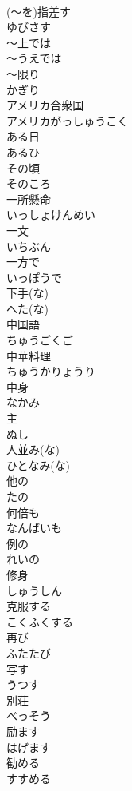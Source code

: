 \documentclass[8pt]{extreport}
\begin{document}
\begin{CJK}{UTF8}{min}
\\	(～を)指差す	
\\	ゆびさす
\\	～上では	
\\	～うえでは
\\	～限り	
\\	かぎり
\\	アメリカ合衆国	
\\	アメリカがっしゅうこく
\\	ある日	
\\	あるひ
\\	その頃	
\\	そのころ
\\	一所懸命	
\\	いっしょけんめい
\\	一文	
\\	いちぶん
\\	一方で	
\\	いっぽうで
\\	下手(な)	
\\	へた(な)
\\	中国語	
\\	ちゅうごくご
\\	中華料理	
\\	ちゅうかりょうり
\\	中身	
\\	なかみ
\\	主	
\\	ぬし
\\	人並み(な)	
\\	ひとなみ(な)
\\	他の	
\\	たの
\\	何倍も	
\\	なんばいも
\\	例の	
\\	れいの
\\	修身	
\\	しゅうしん
\\	克服する	
\\	こくふくする
\\	再び	
\\	ふたたび
\\	写す	
\\	うつす
\\	別荘	
\\	べっそう
\\	励ます	
\\	はげます
\\	勧める	
\\	すすめる

\end{CJK}
\end{document}
